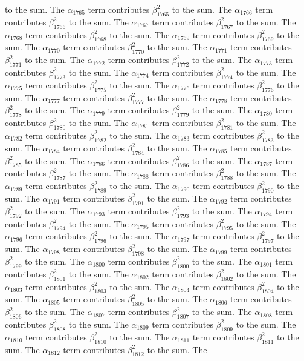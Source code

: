 \begin{lemma}
to the sum. The $\alpha_{1765}$ term contributes $\beta_{1765}^{2}$ to the sum. The $\alpha_{1766}$ term contributes $\beta_{1766}^{2}$ to the sum. The $\alpha_{1767}$ term contributes $\beta_{1767}^{2}$ to the sum. The $\alpha_{1768}$ term contributes $\beta_{1768}^{2}$ to the sum. The $\alpha_{1769}$ term contributes $\beta_{1769}^{2}$ to the sum. The $\alpha_{1770}$ term contributes $\beta_{1770}^{2}$ to the sum. The $\alpha_{1771}$ term contributes $\beta_{1771}^{2}$ to the sum. The $\alpha_{1772}$ term contributes $\beta_{1772}^{2}$ to the sum. The $\alpha_{1773}$ term contributes $\beta_{1773}^{2}$ to the sum. The $\alpha_{1774}$ term contributes $\beta_{1774}^{2}$ to the sum. The $\alpha_{1775}$ term contributes $\beta_{1775}^{2}$ to the sum. The $\alpha_{1776}$ term contributes $\beta_{1776}^{2}$ to the sum. The $\alpha_{1777}$ term contributes $\beta_{1777}^{2}$ to the sum. The $\alpha_{1778}$ term contributes $\beta_{1778}^{2}$ to the sum. The $\alpha_{1779}$ term contributes $\beta_{1779}^{2}$ to the sum. The $\alpha_{1780}$ term contributes $\beta_{1780}^{2}$ to the sum. The $\alpha_{1781}$ term contributes $\beta_{1781}^{2}$ to the sum. The $\alpha_{1782}$ term contributes $\beta_{1782}^{2}$ to the sum. The $\alpha_{1783}$ term contributes $\beta_{1783}^{2}$ to the sum. The $\alpha_{1784}$ term contributes $\beta_{1784}^{2}$ to the sum. The $\alpha_{1785}$ term contributes $\beta_{1785}^{2}$ to the sum. The $\alpha_{1786}$ term contributes $\beta_{1786}^{2}$ to the sum. The $\alpha_{1787}$ term contributes $\beta_{1787}^{2}$ to the sum. The $\alpha_{1788}$ term contributes $\beta_{1788}^{2}$ to the sum. The $\alpha_{1789}$ term contributes $\beta_{1789}^{2}$ to the sum. The $\alpha_{1790}$ term contributes $\beta_{1790}^{2}$ to the sum. The $\alpha_{1791}$ term contributes $\beta_{1791}^{2}$ to the sum. The $\alpha_{1792}$ term contributes $\beta_{1792}^{2}$ to the sum. The $\alpha_{1793}$ term contributes $\beta_{1793}^{2}$ to the sum. The $\alpha_{1794}$ term contributes $\beta_{1794}^{2}$ to the sum. The $\alpha_{1795}$ term contributes $\beta_{1795}^{2}$ to the sum. The $\alpha_{1796}$ term contributes $\beta_{1796}^{2}$ to the sum. The $\alpha_{1797}$ term contributes $\beta_{1797}^{2}$ to the sum. The $\alpha_{1798}$ term contributes $\beta_{1798}^{2}$ to the sum. The $\alpha_{1799}$ term contributes $\beta_{1799}^{2}$ to the sum. The $\alpha_{1800}$ term contributes $\beta_{1800}^{2}$ to the sum. The $\alpha_{1801}$ term contributes $\beta_{1801}^{2}$ to the sum. The $\alpha_{1802}$ term contributes $\beta_{1802}^{2}$ to the sum. The $\alpha_{1803}$ term contributes $\beta_{1803}^{2}$ to the sum. The $\alpha_{1804}$ term contributes $\beta_{1804}^{2}$ to the sum. The $\alpha_{1805}$ term contributes $\beta_{1805}^{2}$ to the sum. The $\alpha_{1806}$ term contributes $\beta_{1806}^{2}$ to the sum. The $\alpha_{1807}$ term contributes $\beta_{1807}^{2}$ to the sum. The $\alpha_{1808}$ term contributes $\beta_{1808}^{2}$ to the sum. The $\alpha_{1809}$ term contributes $\beta_{1809}^{2}$ to the sum. The $\alpha_{1810}$ term contributes $\beta_{1810}^{2}$ to the sum. The $\alpha_{1811}$ term contributes $\beta_{1811}^{2}$ to the sum. The $\alpha_{1812}$ term contributes $\beta_{1812}^{2}$ to the sum. The 
\end{lemma}
